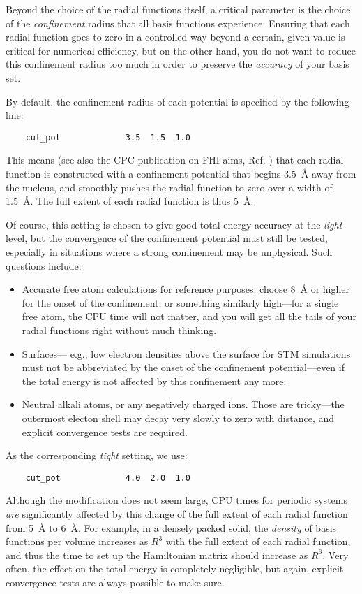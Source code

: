 Beyond the choice of the radial functions itself, a critical parameter is the
choice of the \emph{confinement} radius that all basis functions
experience. Ensuring that each radial function goes to zero in a controlled
way beyond a certain, given value is critical for numerical efficiency, but on
the other hand, you do not want to reduce this confinement radius too much in
order to preserve the \emph{accuracy} of your basis set.

By default, the confinement radius of each potential is specified by the
following line:
\begin{verbatim}
    cut_pot             3.5  1.5  1.0
\end{verbatim}
This means (see also the CPC publication on FHI-aims, Ref. \cite{Blum08}) that each radial
function is constructed with a confinement potential that begins 3.5~{\AA}
away from the nucleus, and smoothly pushes the radial function to zero over a
width of 1.5~{\AA}. The full extent of each radial function is thus 5~{\AA}. 

Of course, this setting is chosen to give good total energy accuracy at the
\emph{light} level, but the convergence of the confinement potential
must still be tested, especially in situations where a strong
confinement may be unphysical. Such questions include: 
\begin{itemize}
  \item Accurate free atom calculations for reference purposes: choose 8~{\AA}
  or higher for the onset of the confinement, or something similarly
  high---for a single free atom, the CPU time will not matter, and
  you will get
  all the tails of your radial functions right without much thinking.
  \item Surfaces--- e.g., low electron densities above the surface for STM
  simulations must not be abbreviated by the onset of the confinement
  potential---even if the total energy is not affected by this confinement any
  more. 
  \item Neutral alkali atoms, or any negatively charged ions. Those are
  tricky---the outermost electon shell may decay very slowly to zero with
  distance, and explicit convergence tests are required.
\end{itemize}

As the corresponding \emph{tight} setting, we use:
\begin{verbatim}
    cut_pot             4.0  2.0  1.0
\end{verbatim}
Although the modification does not seem large, CPU times for periodic systems
\emph{are} significantly affected by this change of the full extent of each
radial function from 5~{\AA} to 6~{\AA}. For example, in a densely
packed solid, the \emph{density} of basis functions per volume
increases as $R^3$ with the full extent of each radial function, and
thus the time to set up the Hamiltonian matrix should increase as
$R^6$. Very often, the effect on the total
energy is completely negligible, but again, explicit convergence tests are
always possible to make sure.

